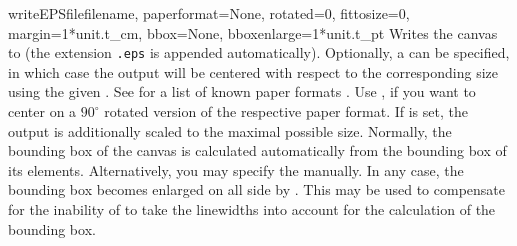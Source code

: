 \begin{methoddesc}{writeEPSfile}{filename, paperformat=None,
    rotated=0, fittosize=0, margin=1*unit.t_cm, bbox=None,
    bboxenlarge=1*unit.t_pt}
  Writes the canvas to  (the extension \texttt{.eps} is
  appended automatically). Optionally, a  can be
  specified, in which case the output will be centered with respect to
  the corresponding size using the given . See
   for a list of known paper formats .  Use
  , if you want to center on a $90^\circ$ rotated version
  of the respective paper format. If  is set, the
  output is additionally scaled to the maximal possible size.
  Normally, the bounding box of the canvas is calculated automatically
  from the bounding box of its elements.  Alternatively, you may
  specify the  manually. In any case, the bounding box
  becomes enlarged on all side by . This may be used
  to compensate for the inability of \PyX{} to take the linewidths
  into account for the calculation of the bounding box.
\end{methoddesc}




